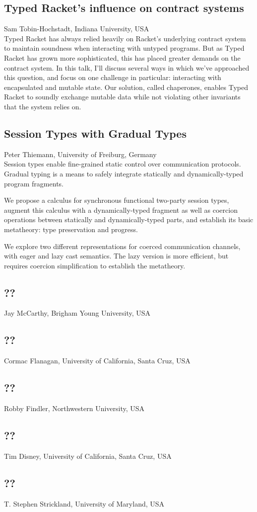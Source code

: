 \documentclass[11pt]{article}
\begin{document}
\subsection*{Typed Racket’s influence on contract systems}
\noindent Sam Tobin-Hochstadt, Indiana University, USA \\[0.5ex]

Typed Racket has always relied heavily on Racket's underlying contract
system to maintain soundness when interacting with untyped
programs. But as Typed Racket has grown more sophisticated, this has
placed greater demands on the contract system.  In this talk, I'll
discuss several ways in which we've approached this question, and
focus on one challenge in particular: interacting with encapsulated
and mutable state.  Our solution, called chaperones, enables Typed
Racket to soundly exchange mutable data while not violating other
invariants that the system relies on.

\subsection*{Session Types with Gradual Types}
\noindent Peter Thiemann, University of Freiburg, Germany \\[0.5ex]

Session types enable fine-grained static control over communication
protocols. Gradual typing is a means to safely integrate statically
and dynamically-typed program fragments.

We propose a calculus for synchronous functional two-party session
types, augment this calculus with a dynamically-typed fragment as well
as coercion operations between statically and dynamically-typed parts,
and establish its basic metatheory: type preservation and progress.

We explore two different representations for coerced communication
channels, with eager and lazy cast semantics. The lazy version is more
efficient, but requires coercion simplification to establish the
metatheory.

\subsection*{??}
\noindent Jay McCarthy, Brigham Young University, USA

\subsection*{??}
\noindent Cormac Flanagan, University of California, Santa Cruz, USA

\subsection*{??}
\noindent Robby	Findler, Northwestern University, USA

\subsection*{??}
\noindent Tim Disney, University of California, Santa Cruz, USA

\subsection*{??}
\noindent T.	Stephen	Strickland, University of Maryland, USA
\end{document}
